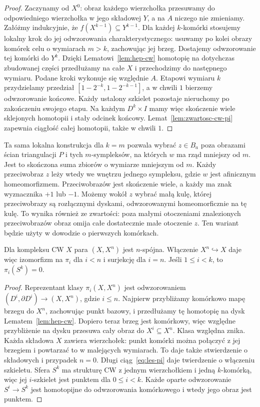 \begin{proof}
Zaczynamy od $X^0$:
obraz każdego wierzchołka
przesuwamy do odpowiedniego
wierzchołka w jego składowej
$Y$, a na $A$ niczego
nie zmieniamy. Załóżmy
indukcyjnie, że
$f(X^{k-1})\subseteq Y^{k-1}$.
Dla każdej $k$-komórki
stosujemy lokalny krok
do jej odwzorowania
charakterystycznego:
usuwamy po kolei obrazy
komórek celu o wymiarach
$m>k$, zachowując
jej brzeg. Dostajemy
odwzorowanie tej komórki do
$Y^k$. Dzięki
Lematowi~\ref{lem:hep-cw}
homotopię na dotychczas
zbudowanej części
przedłużamy na całe $X$
i przechodzimy do
następnego wymiaru.
Podane kroki wykonuje
się względnie $A$.
Etapowi wymiaru $k$ przydzielamy przedział
$[1-2^{-k},1-2^{-k-1}]$, a w chwili $1$ bierzemy odwzorowanie końcowe.
Każdy ustalony szkielet pozostaje nieruchomy po zakończeniu swojego etapu.
Na każdym $D^k\times I$ mamy więc skończenie wiele sklejonych homotopii
i stały odcinek końcowy. Lemat~\ref{lem:zwartosc-cw-pi}
zapewnia ciągłość całej homotopii, także w chwili $1$.
\end{proof}

\begin{uwaga}
\label{rem:przyblizenie-rowne-wymiary}
Ta sama lokalna konstrukcja dla $k=m$ pozwala wybrać $z\in B_a$
poza obrazami ścian triangulacji $P$ i tych $m$-sympleksów,
na których $w$ ma rząd mniejszy od $m$. Jest to skończona suma
zbiorów o wymiarze mniejszym od $m$. Każdy przeciwobraz $z$
leży wtedy we wnętrzu jednego sympleksu, gdzie $w$ jest afinicznym homeomorfizmem.
Przeciwobrazów jest skończenie wiele, a każdy ma znak wyznacznika $+1$ lub $-1$.
Możemy wokół $z$ wybrać małą kulę, której przeciwobrazy są rozłącznymi
dyskami, odwzorowanymi homeomorficznie na tę kulę.
To wynika również ze zwartości: poza małymi otoczeniami znalezionych
przeciwobrazów obraz omija całe dostatecznie małe otoczenie $z$.
Ten wariant będzie użyty w dowodzie o pierwszych komórkach.
\end{uwaga}

\begin{wniosek}
\label{cor:pi-szkielety}
Dla kompleksu CW $X$ para
$(X,X^n)$ jest $n$-spójna.
Włączenie $X^n\hookrightarrow X$
daje więc izomorfizm na
$\pi_i$ dla $i<n$
i surjekcję dla $i=n$.
Jeśli $1\leq i<k$, to
$\pi_i(S^k)=0$.
\end{wniosek}
\begin{proof}
Reprezentant klasy
$\pi_i(X,X^n)$ jest
odwzorowaniem $(D^i,\partial D^i)\to
(X,X^n)$, gdzie $i\leq n$.
Najpierw przybliżamy komórkowo mapę brzegu do $X^n$,
zachowując punkt bazowy, i przedłużamy tę homotopię na dysk
Lematem~\ref{lem:hep-cw}. Dopiero teraz brzeg jest komórkowy,
więc względne przybliżenie na dysku przesuwa cały obraz do
$X^i\subseteq X^n$. Klasa względna znika.
Każda składowa $X$ zawiera wierzchołek: punkt komórki można
połączyć z jej brzegiem i powtarzać to w malejących wymiarach.
To daje także stwierdzenie o składowych i przypadek $n=0$.
Długi ciąg~\eqref{eq:les-pi}
daje twierdzenie o
włączeniu szkieletu.
Sfera $S^k$ ma strukturę CW
z jednym wierzchołkiem
i jedną $k$-komórką,
więc jej $i$-szkielet
jest punktem dla $0\leq i<k$.
Każde oparte odwzorowanie
$S^i\to S^k$ jest
homotopijne do odwzorowania
komórkowego i wtedy
jego obraz jest punktem.
\end{proof}

